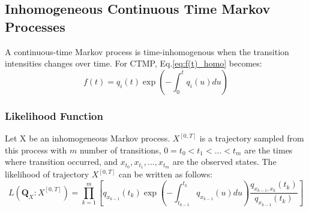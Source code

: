 %
\subsection{Inhomogeneous Continuous Time Markov Processes}
A continuous-time Markov process is time-inhomogenous when the transition intensities changes over time.
For CTMP, Eq.\ref{eq:f(t)_homo} becomes:
\begin{equation}
f(t) = q_{i}(t) \exp \left(-\int_{0}^{t} q_{i}(u) d u\right)
\end{equation}
\subsubsection{Likelihood Function}
Let X be an inhomogeneous Markov process. $  X^{\left[0,T\right] } $ is a trajectory sampled from this process with $ m $ number of transitions, $ 0 = t_{0} < t_{1} < ... < t_{m} $ are the times where transition occurred, and $ x_{t_{0}}, x_{t_{1}},..., x_{t_{m}} $ are the observed states. The likelihood of trajectory  $  X^{\left[0,T\right] } $ can be written as follows: 
\begin{equation}
L(\textbf{Q}_{X} \colon  X^{\left[0,T\right]} ) = \prod_{k=1}^{m} \left[ q_{x_{k-1}} (t_{k}) \exp \left(-\int_{t_{k-1}}^{t_{k}} q_{x_{k-1}}(u) d u\right) \frac{q_{x_{k-1}, x_{k}} (t_{k})}{q_{x_{k-1}}(t_{k})}\right] 
\label{eq:lh_traj_inhomo}
\end{equation}

